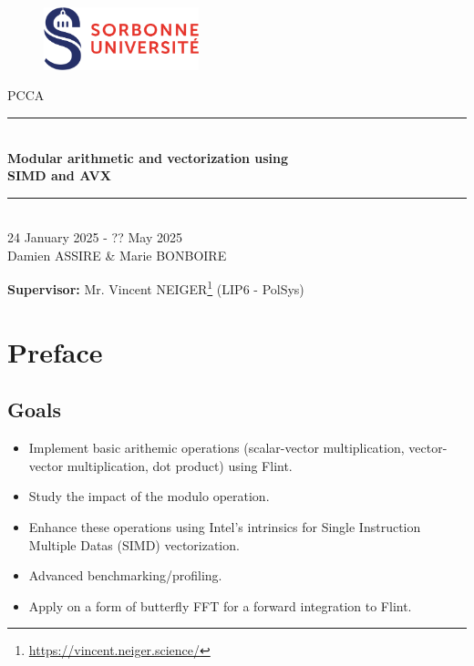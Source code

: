 \documentclass[a4paper]{article}
\begin{document}
\thispagestyle{plain}
\begin{titlepage}
    \begin{figure}[h]
        \centering
        \includegraphics[width=0.4\textwidth]{su.png}
    \end{figure}
    \vspace{1cm}

    \begin{center}
        {\LARGE PCCA}\\[0.3cm]
        \rule{\linewidth}{0.5mm} \\[0.4cm]
        {\huge \textbf{Modular arithmetic and vectorization using\\ SIMD and AVX}}\\[0.4cm]
        \rule{\linewidth}{0.5mm} \\[1cm]
        {\large 24 January 2025 - ?? May 2025}\\[3cm]

        {\Large Damien ASSIRE \& Marie BONBOIRE}


    \end{center}

    \vfill
\begin{flushleft}{\large
    \textbf{Supervisor:} Mr. Vincent NEIGER\footnote{\url{https://vincent.neiger.science/}} (LIP6 - PolSys)\\
    }
\end{flushleft}
\end{titlepage}
\newpage

\tableofcontents
\newpage

\section{Preface}

\subsection{Goals}
\begin{itemize}
    \item Implement basic arithemic operations (scalar-vector multiplication, vector-vector multiplication, dot product) using Flint.
    \item Study the impact of the modulo operation.
    \item Enhance these operations using Intel's intrinsics for Single Instruction Multiple Datas (SIMD) vectorization.
    \item Advanced benchmarking/profiling.
    \item Apply on a form of butterfly FFT for a forward integration to Flint.
\end{itemize}
\end{document}
